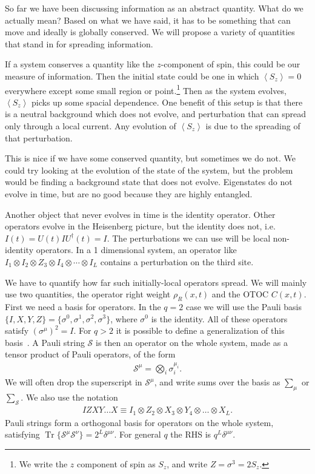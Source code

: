 \documentclass[a4paper,11pt]{article}
\newcommand{\ex}[1]{\left\langle #1 \right\rangle}
\renewcommand{\S}{\mathcal{S}}
\DeclareMathOperator{\Tr}{Tr}
\begin{document}
So far we have been discussing information as an abstract quantity. What do we actually mean? Based on what we have said, it has to be something that can move and ideally is globally conserved. We will propose a variety of quantities that stand in for spreading information.

If a system conserves a quantity like the $z$-component of spin, this could be our measure of information. Then the initial state could be one in which $\ex{S_z} = 0$ everywhere except some small region or point.\footnote{We write the $z$ component of spin as $S_z$, and write $Z=\sigma^3=2S_z$.} Then as the system evolves, $\ex{S_z}$ picks up some spacial dependence. One benefit of this setup is that there is a neutral background which does not evolve, and perturbation that can spread only through a local current. Any evolution of $\ex{S_z}$ is due to the spreading of that perturbation.

This is nice if we have some conserved quantity, but sometimes we do not. We could try looking at the evolution of the state of the system, but the problem would be finding a background state that does not evolve. 
Eigenstates do not evolve in time, but are no good because they are highly entangled.

Another object that never evolves in time is the identity operator. Other operators evolve in the Heisenberg picture, but the identity does not, i.e. $I(t)=U(t)IU^\dag(t)=I$. The perturbations we can use will be local non-identity operators. In a 1 dimensional system, an operator like $I_1\otimes I_2\otimes Z_3 \otimes I_4\otimes\cdots\otimes I_L$ contains a perturbation on the third site. 

We have to quantify how far such initially-local operators spread. We will mainly use two quantities, the operator right weight $\rho_R(x,t)$ and the OTOC $C(x,t)$. First we need a basis for operators. In the $q=2$ case we will use the Pauli basis $\{I, X, Y, Z\} = \{\sigma^0, \sigma^1, \sigma^2, \sigma^3\}$, where $\sigma^0$ is the identity. All of these operators satisfy $(\sigma^\mu)^2=I$. For $q>2$ it is possible to define a generalization of this basis~\cite{vonKeyserlingkHydro}. A Pauli string $\S$ is then an operator on the whole system, made as a tensor product of Pauli operators, of the form
\begin{align}
\S^\mu = \bigotimes_i\sigma_i^{\mu_i}.
\end{align}
We will often drop the superscript in $\S^\mu$, and write sums over the basis as $\sum_\mu$ or $\sum_\S$. We also use the notation 
\begin{align}
IZXY\dots X \equiv I_1\otimes Z_2\otimes X_3\otimes Y_4 \otimes\dots\otimes X_L.
\end{align}
Pauli strings form a orthogonal basis for operators on the whole system, satisfying $\Tr\{\S^\mu\S^\nu\} = 2^L\delta^{\mu\nu}$. For general $q$ the RHS is $q^L\delta^{\mu\nu}$. 
\end{document}
